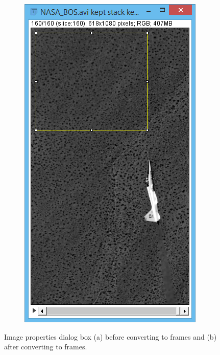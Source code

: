\documentclass[letterpaper,12pt]{article}
\begin{document}
\begin{figure}[h]
\begin{subfigure}[b]{0.25\textwidth}
        \includegraphics[width=\textwidth]{Image_Registration_ROI_Slice160.PNG}
        \caption{}
        \label{fig:Image_Registration_ROI_Slice160}
    \end{subfigure}
 	
    \caption{Image properties dialog box (a) before converting to frames and (b) after converting to frames.}
    \label{fig:Image_Registration_ROI}
\end{figure}
\end{document}
